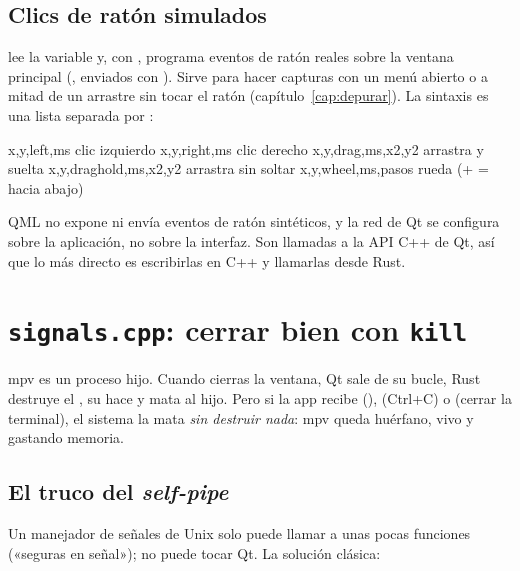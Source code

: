 \subsection{Clics de ratón simulados}

 lee la variable  y, con
, programa eventos de ratón reales sobre la ventana principal
(,  enviados con ).
Sirve para hacer capturas con un menú abierto o a mitad de un arrastre sin tocar el ratón
(capítulo~\ref{cap:depurar}). La sintaxis es una lista separada por \cod{;}:

\begin{codigo}
x,y,left,ms            clic izquierdo       x,y,right,ms         clic derecho
x,y,drag,ms,x2,y2      arrastra y suelta    x,y,draghold,ms,x2,y2  arrastra sin soltar
x,y,wheel,ms,pasos     rueda (+ = hacia abajo)
\end{codigo}

\begin{porque}
QML no expone  ni envía eventos de ratón sintéticos, y la red de Qt
se configura sobre la aplicación, no sobre la interfaz. Son llamadas a la API C++ de Qt, así
que lo más directo es escribirlas en C++ y llamarlas desde Rust.
\end{porque}

\section{\texttt{signals.cpp}: cerrar bien con \texttt{kill}}

mpv es un proceso hijo. Cuando cierras la ventana, Qt sale de su bucle, Rust destruye el
, su  hace  y mata al hijo. Pero si la app recibe
 (),  (Ctrl+C) o  (cerrar la terminal), el
sistema la mata \emph{sin destruir nada}: mpv queda huérfano, vivo y gastando memoria.

\subsection{El truco del \emph{self-pipe}}

Un manejador de señales de Unix solo puede llamar a unas pocas funciones («seguras en señal»);
no puede tocar Qt. La solución clásica:

